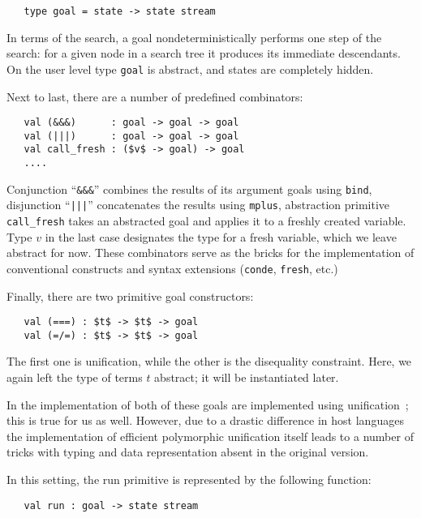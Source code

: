 \begin{lstlisting}
   type goal = state -> state stream
\end{lstlisting}

In terms of the search, a goal nondeterministically performs one step of the search: for a given
node in a search tree it produces its immediate descendants. On the user level type \lstinline{goal}
is abstract, and states are completely hidden.

Next to last, there are a number of predefined combinators:

\begin{lstlisting}
   val (&&&)      : goal -> goal -> goal
   val (|||)      : goal -> goal -> goal
   val call_fresh : ($v$ -> goal) -> goal
   ....
\end{lstlisting}

Conjunction ``\lstinline{&&&}'' combines the results of its argument goals using \lstinline{bind},
disjunction ``\lstinline{|||}'' concatenates the results using \lstinline{mplus}, abstraction
primitive \lstinline{call_fresh} takes an abstracted goal and applies it to a freshly created
variable. Type $v$ in the last case designates the type for a fresh variable, which we leave
abstract for now. These combinators serve as the bricks for the implementation of conventional
\miniKanren constructs and syntax extensions (\lstinline{conde}, \lstinline{fresh}, etc.)

Finally, there are two primitive goal constructors:

\begin{lstlisting}
   val (===) : $t$ -> $t$ -> goal
   val (=/=) : $t$ -> $t$ -> goal
\end{lstlisting}

The first one is unification, while the other is the disequality constraint. Here, we again left
the type of terms $t$ abstract; it will be instantiated later.

In the implementation of \miniKanren both of these goals are implemented using unification~\cite{CKanren}; this
is true for us as well. However, due to a drastic difference in host languages the implementation of
efficient polymorphic unification itself leads to a number of tricks with typing and data representation
absent in the original version.

In this setting, the run primitive is represented by the following function:

\begin{lstlisting}
   val run : goal -> state stream
\end{lstlisting}

